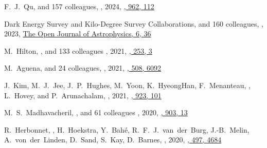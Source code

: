 \begin{etaremune}
\item
F.~J.~Qu, and 157 colleagues,
,
2024, \href{https://ui.adsabs.harvard.edu/abs/2024ApJ...962..112Q}{\apj, 962, 112}

\item
Dark Energy Survey and Kilo-Degree Survey Collaborations, and 160 colleagues,
,
2023, \href{https://ui.adsabs.harvard.edu/abs/2023OJAp....6E..36D}{The Open Journal of Astrophysics, 6, 36}

\item
M.~Hilton, \myself, and 133 colleagues
,
2021, \href{https://ui.adsabs.harvard.edu/abs/2021ApJS..253....3H/abstract}{\apjs, 253, 3}

\item
M.~Aguena, and 24 colleagues,
,
2021, \href{https://ui.adsabs.harvard.edu/abs/2021MNRAS.508.6092A}{\mnras, 508, 6092}

\item
J.~Kim, M.~J.~Jee, J.~P.~Hughes, M.~Yoon, K.~HyeongHan, F.~Menanteau, \myself, L.~Hovey, and P.~Arunachalam,
,
2021, \href{https://ui.adsabs.harvard.edu/abs/2021ApJ...923..101K}{\apj, 923, 101}

\item
M.~S.~Madhavacheril, \myself, and 61 colleagues
,
2020, \href{https://ui.adsabs.harvard.edu/abs/2020ApJ...903L..13M/abstract}{\apjl, 903, 13}

\item
R.~Herbonnet, \myself, H.~Hoekstra, Y.~Bah\'e, R.~F.~J.~van~der~Burg, 
J.-B.~Melin, A.~von~der~Linden, D.~Sand, S.~Kay, D.~Barnes,
,
2020, \href{https://ui.adsabs.harvard.edu/abs/2020MNRAS.497.4684H/abstract}{\mnras, 497, 4684}


\end{etaremune}

